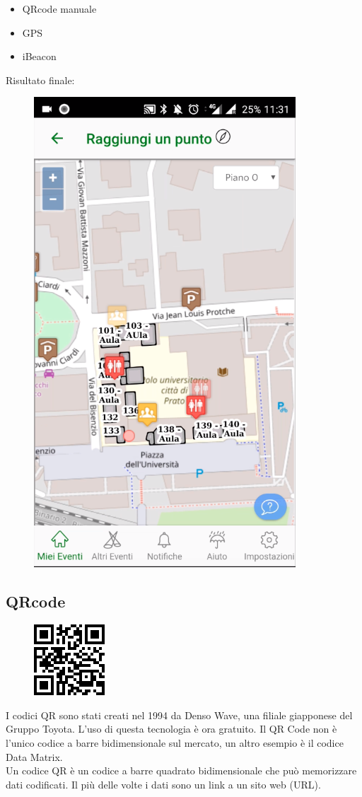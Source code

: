 \begin{itemize}
    \item QRcode manuale
    \item GPS
    \item iBeacon
\end{itemize}


Risultato finale:
\begin{figure}[H]
    \centering  
    \includegraphics[scale=0.5]{img/cap2/geo-1}
\end{figure}


\subsection{QRcode}
\begin{figure}[H]
    \centering  
    \includegraphics[scale=1]{img/cap2/barcode-qrcode}
\end{figure}
I codici QR sono stati creati nel 1994 da Denso Wave, una filiale giapponese del Gruppo Toyota.
L'uso di questa tecnologia è ora gratuito. Il QR Code non è l'unico codice a barre bidimensionale 
sul mercato, un altro esempio è il codice Data Matrix.
\\
Un codice QR è un codice a barre quadrato bidimensionale che può memorizzare dati codificati. 
Il più delle volte i dati sono un link a un sito web (URL).

